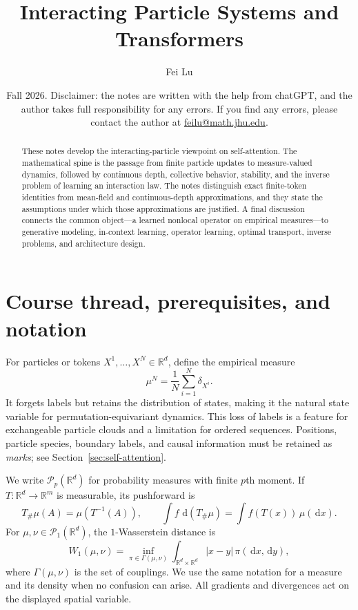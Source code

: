 \documentclass[11pt]{amsart}
\title{Interacting Particle Systems and Transformers}
\author{Fei Lu}
\date{Fall 2026. Disclaimer: the notes are written with the help from chatGPT, and the author takes full responsibility for any errors. If you find any errors, please contact the author at \href{mailto:feilu@math.jhu.edu}{feilu@math.jhu.edu}.}
\numberwithin{equation}{section}
\theoremstyle{plain}
\newcommand{\R}{\mathbb{R}}
\newcommand{\cP}{\mathcal{P}}
\newcommand{\dd}{\,\mathrm{d}}
\newcommand{\abs}[1]{\left\lvert#1\right\rvert}
\begin{document}
\begin{abstract}
These notes develop the interacting-particle viewpoint on self-attention.
The mathematical spine is the passage from finite particle updates to
measure-valued dynamics, followed by continuous depth, collective behavior,
stability, and the inverse problem of learning an interaction law.  The notes
distinguish exact finite-token identities from mean-field and continuous-depth
approximations, and they state the assumptions under which those approximations
are justified.  A final discussion connects the common object---a learned
nonlocal operator on empirical measures---to generative modeling, in-context
learning, operator learning, optimal transport, inverse problems, and
architecture design.
\end{abstract}

\maketitle
\tableofcontents

\section*{Course thread, prerequisites, and notation}
For particles or tokens $X^1,\ldots,X^N\in\R^d$, define the empirical measure
\begin{equation}\label{eq:empirical-measure}
    \mu^N=\frac1N\sum_{i=1}^N\delta_{X^i}.
\end{equation}
It forgets labels but retains the distribution of states, making it the natural
state variable for permutation-equivariant dynamics.  This loss of labels is a
feature for exchangeable particle clouds and a limitation for ordered
sequences.  Positions, particle species, boundary labels, and causal
information must be retained as \emph{marks}; see
Section~\ref{sec:self-attention}.

We write $\cP_p(\R^d)$ for probability measures with finite $p$th moment.  If
$T:\R^d\to\R^m$ is measurable, its pushforward is
\[
    T_\#\mu(A)=\mu(T^{-1}(A)),\qquad
    \int f\,\dd(T_\#\mu)=\int f(T(x))\,\mu(\dd x).
\]
For $\mu,\nu\in\cP_1(\R^d)$, the $1$-Wasserstein distance is
\begin{equation}\label{eq:w1-definition}
    W_1(\mu,\nu)
    =\inf_{\pi\in\Gamma(\mu,\nu)}
      \int_{\R^d\times\R^d}\abs{x-y}\,\pi(\dd x,\dd y),
\end{equation}
where $\Gamma(\mu,\nu)$ is the set of couplings.  We use the same notation for a
measure and its density when no confusion can arise.  All gradients and
divergences act on the displayed spatial variable.
\end{document}
